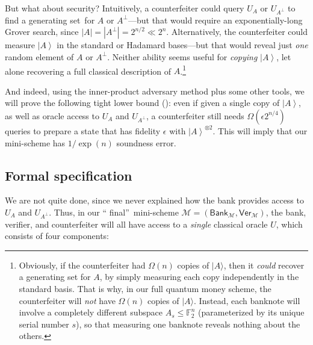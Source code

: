 But what about security? Intuitively, a counterfeiter could query $U_{A}$ or
$U_{A^{\bot}}$ to find a generating set\ for $A$ or $A^{\bot}$---but that
would require an exponentially-long Grover search, since $\left\vert
A\right\vert =\left\vert A^{\bot}\right\vert =2^{n/2}\ll2^{n}$. Alternatively,
the counterfeiter could measure $\left\vert A\right\rangle $ in the standard
or Hadamard bases---but that would reveal just \emph{one} random element of
$A$ or $A^{\bot}$. Neither ability seems useful for \emph{copying}
$\left\vert A\right\rangle $, let alone recovering a full classical
description of $A$.\footnote{Obviously, if the counterfeiter had
$\Omega(  n)$ copies of $\vert A\rangle $, then it
\emph{could} recover a generating set for $A$, by simply measuring each copy
independently in the standard basis. That is why, in our full quantum money
scheme, the counterfeiter will \emph{not} have $\Omega(n)$ copies of $\vert A\rangle$. Instead, each banknote will
involve a completely different subspace $A_{s}\leq\mathbb{F}_{2}^{n}$
(parameterized by its unique serial number $s$), so that measuring one
banknote reveals nothing about the others.}

And indeed, using the inner-product adversary method plus some other tools, we
will prove the following tight lower bound (): even
if given a single copy of $\left\vert A\right\rangle $, as well as oracle
access to $U_{A}$ and $U_{A^{\bot}}$, a counterfeiter still needs
$\Omega\left(\epsilon2^{n/4}\right)$ queries to prepare a state that
has fidelity $\epsilon$ with $\left\vert A\right\rangle ^{\otimes2}%
$. This will imply that our mini-scheme has $1/\exp(n)$ soundness error.

\subsection{Formal specification\label{SPEC}}

We are not quite done, since we never explained how the bank provides access
to $U_{A}$ and $U_{A^{\bot}}$. Thus, in our \textquotedblleft
final\textquotedblright\ mini-scheme $\mathcal{M}=\left(  \mathsf{Bank}%
_{\mathcal{M}},\mathsf{Ver}_{\mathcal{M}}\right)  $, the bank, verifier, and
counterfeiter will all have access to a \emph{single} classical oracle $U$,
which consists of four components:

